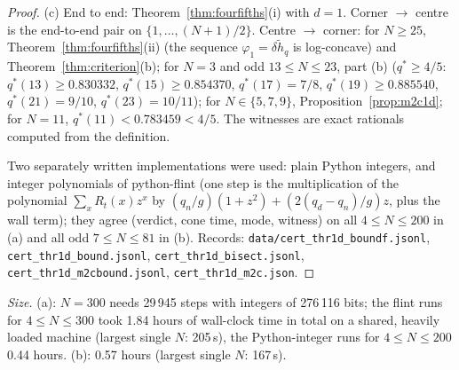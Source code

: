 \documentclass[11pt,a4paper]{article}
\theoremstyle{definition}
\begin{document}
\begin{proof}
(c) End to end: Theorem~\ref{thm:fourfifths}(i) with $d=1$. Corner $\to$ centre is the end-to-end pair on $\{1,\dots,(N+1)/2\}$. Centre $\to$ corner: for $N\ge25$, Theorem~\ref{thm:fourfifths}(ii) (the sequence $\varphi_1=\delta\tilde h_q$ is log-concave) and Theorem~\ref{thm:criterion}(b); for $N=3$ and odd $13\le N\le23$, part (b) ($q^*\ge4/5$: $q^*(13)\ge0.830332$, $q^*(15)\ge0.854370$, $q^*(17)=7/8$, $q^*(19)\ge0.885540$, $q^*(21)=9/10$, $q^*(23)=10/11$); for $N\in\{5,7,9\}$, Proposition~\ref{prop:m2c1d}; for $N=11$, $q^*(11)<0.783459<4/5$. The witnesses are exact rationals computed from the definition.

Two separately written implementations were used: plain Python integers, and integer polynomials of python-flint (one step is the multiplication of the polynomial $\sum_xR_t(x)z^x$ by $(q_n/g)(1+z^2)+(2(q_d-q_n)/g)z$, plus the wall term); they agree (verdict, cone time, mode, witness) on all $4\le N\le200$ in (a) and all odd $7\le N\le81$ in (b). Records: \texttt{data/cert\_thr1d\_boundf.jsonl}, \texttt{cert\_thr1d\_bound.jsonl}, \texttt{cert\_thr1d\_bisect.jsonl}, \texttt{cert\_thr1d\_m2cbound.jsonl}, \texttt{cert\_thr1d\_m2c.json}.
\end{proof}

\emph{Size.} (a): $N=300$ needs 29\,945 steps with integers of 276\,116 bits; the flint runs for $4\le N\le300$ took 1.84 hours of wall-clock time in total on a shared, heavily loaded machine (largest single $N$: 205\,s), the Python-integer runs for $4\le N\le200$ 0.44 hours. (b): 0.57 hours (largest single $N$: 167\,s).
\end{document}
